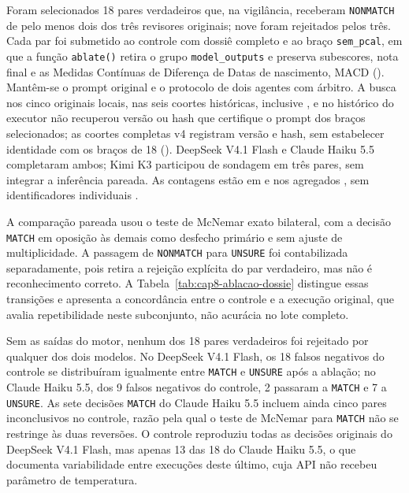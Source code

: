 Foram selecionados 18 pares verdadeiros que, na vigilância, receberam \texttt{NONMATCH} de pelo menos dois dos três revisores originais; nove foram rejeitados pelos três. Cada par foi submetido ao controle com dossiê completo e ao braço \texttt{sem\_pcal}, em que a função \texttt{ablate()} retira o grupo \texttt{model\_outputs} e preserva subescores, nota final e as Medidas Contínuas de Diferença de Datas de nascimento, MACD (). Mantêm-se o prompt original e o protocolo de dois agentes com árbitro. A busca nos cinco originais locais, nas seis coortes históricas, inclusive , e no histórico do executor não recuperou versão ou hash que certifique o prompt dos braços selecionados; as coortes completas v4 registram versão e hash, sem estabelecer identidade com os braços de 18 (). DeepSeek V4.1 Flash e Claude Haiku 5.5 completaram ambos; Kimi K3 participou de sondagem em três pares, sem integrar a inferência pareada. As contagens estão em  e nos agregados , sem identificadores individuais \cite{Jardim2026phdrepo}.

A comparação pareada usou o teste de McNemar exato bilateral, com a decisão \texttt{MATCH} em oposição às demais como desfecho primário e sem ajuste de multiplicidade. A passagem de \texttt{NONMATCH} para \texttt{UNSURE} foi contabilizada separadamente, pois retira a rejeição explícita do par verdadeiro, mas não é reconhecimento correto. A Tabela~\ref{tab:cap8-ablacao-dossie} distingue essas transições e apresenta a concordância entre o controle e a execução original, que avalia repetibilidade neste subconjunto, não acurácia no lote completo.



Sem as saídas do motor, nenhum dos 18 pares verdadeiros foi rejeitado por qualquer dos dois modelos. No DeepSeek V4.1 Flash, os 18 falsos negativos do controle se distribuíram igualmente entre \texttt{MATCH} e \texttt{UNSURE} após a ablação; no Claude Haiku 5.5, dos 9 falsos negativos do controle, 2 passaram a \texttt{MATCH} e 7 a \texttt{UNSURE}. As sete decisões \texttt{MATCH} do Claude Haiku 5.5 incluem ainda cinco pares inconclusivos no controle, razão pela qual o teste de McNemar para \texttt{MATCH} não se restringe às duas reversões. O controle reproduziu todas as decisões originais do DeepSeek V4.1 Flash, mas apenas 13 das 18 do Claude Haiku 5.5, o que documenta variabilidade entre execuções deste último, cuja API não recebeu parâmetro de temperatura.

